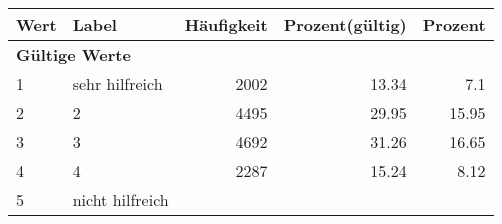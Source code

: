      \begin{longtable}{lXrrr}
     \toprule
     \textbf{Wert} & \textbf{Label} & \textbf{Häufigkeit} & \textbf{Prozent(gültig)} & \textbf{Prozent} \\
     \endhead
     \midrule
     \multicolumn{5}{l}{\textbf{Gültige Werte}}\\

     1 &
     \multicolumn{1}{X}{ sehr hilfreich   } &


       \num{2002} &
       \num[round-mode=places,round-precision=2]{13.34} &
         \num[round-mode=places,round-precision=2]{7.1} \\

     2 &
     \multicolumn{1}{X}{ 2   } &


       \num{4495} &
       \num[round-mode=places,round-precision=2]{29.95} &
         \num[round-mode=places,round-precision=2]{15.95} \\

     3 &
     \multicolumn{1}{X}{ 3   } &


       \num{4692} &
       \num[round-mode=places,round-precision=2]{31.26} &
         \num[round-mode=places,round-precision=2]{16.65} \\

     4 &
     \multicolumn{1}{X}{ 4   } &


       \num{2287} &
       \num[round-mode=places,round-precision=2]{15.24} &
         \num[round-mode=places,round-precision=2]{8.12} \\

     5 &
     \multicolumn{1}{X}{ nicht hilfreich   } &



\end{longtable}
